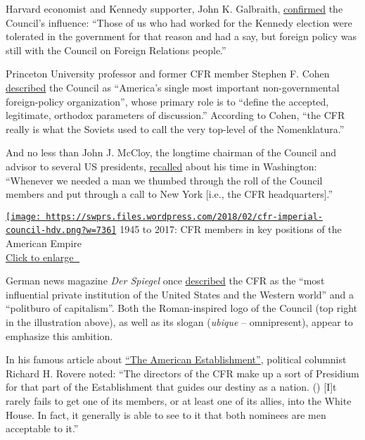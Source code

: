 Harvard economist and Kennedy supporter, John K. Galbraith,
\href{http://www.penguinrandomhouse.com/books/73633/the-best-and-the-brightest-by-david-halberstam/9780449908709/}{confirmed}
the Council's influence: ``Those of us who had worked for the Kennedy
election were tolerated in the government for that reason and had a say,
but foreign policy was still with the Council on Foreign Relations
people.''

Princeton University professor and former CFR member Stephen F. Cohen
\href{https://www.thenation.com/article/the-american-bipartisan-policy-establishment-declares-its-second-cold-war-vs-russia-after-years-of-denying-it/}{described}
the Council as ``America's single most important non-governmental
foreign-policy organization'', whose primary role is to ``define the
accepted, legitimate, orthodox parameters of discussion.'' According to
Cohen, ``the CFR really is what the Soviets used to call the very
top-level of the Nomenklatura.''

And no less than John J. McCloy, the longtime chairman of the Council
and advisor to several US presidents,
\href{http://www.nytimes.com/1971/11/21/archives/is-it-a-club-seminar-presidium-invisible-government-the-council-on-.html}{recalled}
about his time in Washington: ``Whenever we needed a man we thumbed
through the roll of the Council members and put through a call to New
York {[}i.e., the CFR headquarters{]}.''

\href{https://swprs.files.wordpress.com/2018/02/cfr-imperial-council-hdv.png}{\texttt{[image: https://swprs.files.wordpress.com/2018/02/cfr-imperial-council-hdv.png?w=736]}}
1945 to 2017: CFR members in key positions of the American Empire\\
\href{https://swprs.files.wordpress.com/2018/02/cfr-imperial-council-hdv.png}{Click
to enlarge 🔎}

German news magazine \emph{Der Spiegel} once
\href{http://magazin.spiegel.de/EpubDelivery/spiegel/pdf/41389590}{described}
the CFR as the ``most influential private institution of the United
States and the Western world'' and a ``politburo of capitalism''. Both
the Roman-inspired logo of the Council (top right in the illustration
above), as well as its slogan (\emph{ubique} -- omnipresent), appear to
emphasize this ambition.

In his famous article about
\href{http://archive.wilsonquarterly.com/sites/default/files/articles/WQ_VOL2_SU_1978_Article_05.pdf}{``The
American Establishment''}, political columnist Richard H. Rovere noted:
``The directors of the CFR make up a sort of Presidium for that part of
the Establishment that guides our destiny as a nation. () {[}I{]}t
rarely fails to get one of its members, or at least one of its allies,
into the White House. In fact, it generally is able to see to it that
both nominees are men acceptable to it.''

